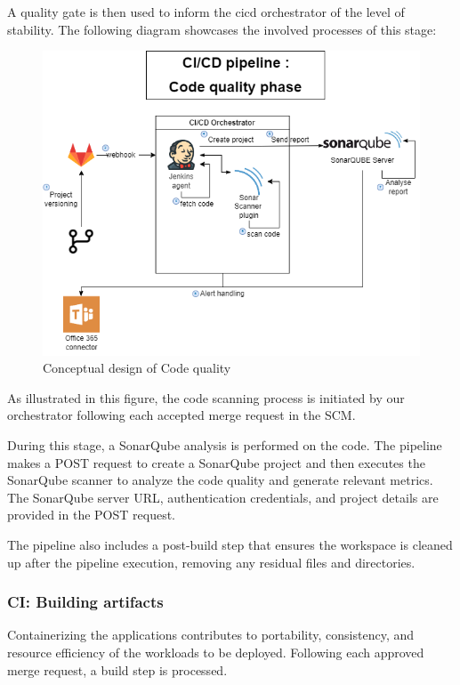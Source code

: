 A quality gate is then used to inform the cicd orchestrator of the level of stability. The following diagram showcases the involved processes of this stage: 

\begin{figure}[H]\centering
\includegraphics[width=1.0\textwidth,angle=00]{assets/f48.png}
\caption{ Conceptual design of Code quality }
\label{fig:conceptual design of Code quality }
\end{figure}

As illustrated in this figure, the code scanning process is initiated by our orchestrator following each accepted merge request in the SCM.

During this stage, a SonarQube analysis is performed on the code. The pipeline makes a POST request to create a SonarQube project and then executes the SonarQube scanner to analyze the code quality and generate relevant metrics. The SonarQube server URL, authentication credentials, and project details are provided in the POST request.

The pipeline also includes a post-build step that ensures the workspace is cleaned up after the pipeline execution, removing any residual files and directories.
 

\subsubsection{CI: Building artifacts}

Containerizing the applications contributes to portability, consistency, and resource efficiency of the workloads to be deployed. Following each approved merge request, a build step is processed. 

